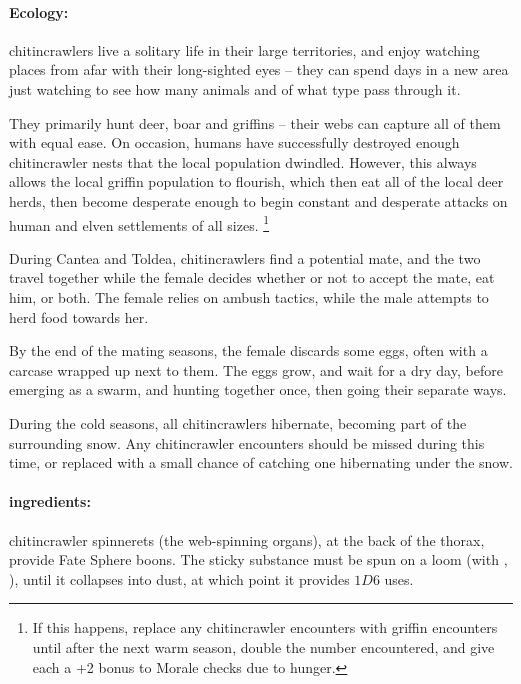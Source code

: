 \begin{multicols}{2}
\paragraph{Ecology:}
chitincrawlers live a solitary life in their large territories, and enjoy watching places from afar with their long-sighted eyes -- they can spend days in a new area just watching to see how many animals and of what type pass through it.

They primarily hunt deer, boar and griffins -- their webs can capture all of them with equal ease.
On occasion, humans have successfully destroyed enough chitincrawler nests that the local population dwindled.
However, this always allows the local griffin population to flourish, which then eat all of the local deer herds, then become desperate enough to begin constant and desperate attacks on human and elven settlements of all sizes.%
\footnote{If this happens, replace any chitincrawler encounters with griffin encounters until after the next warm season, double the number encountered, and give each a +2 bonus to Morale checks due to hunger.}
\label{crawlerBalance}

During \gls{Cantea} and \gls{Toldea}, chitincrawlers find a potential mate, and the two travel together while the female decides whether or not to accept the mate, eat him, or both.
The female relies on ambush tactics, while the male attempts to herd food towards her.

By the end of the mating seasons, the female discards some eggs, often with a carcase wrapped up next to them.
The eggs grow, and wait for a dry day, before emerging as a swarm, and hunting together once, then going their separate ways.

\crawlerSwarm

During the cold seasons, all chitincrawlers hibernate, becoming part of the surrounding snow.
Any chitincrawler encounters should be missed during this time, or replaced with a small chance of catching one hibernating under the snow.

\paragraph{\Glspl{ingredient}:}
chitincrawler spinnerets (the web-spinning organs), at the back of the thorax, provide Fate Sphere \glspl{boon}.
The sticky substance must be spun on a loom (with , \tn[10]), until it collapses into dust, at which point it provides $1D6$ uses.


\end{multicols}
